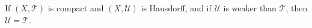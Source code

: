 If $(X, \mathcal{T})$ is compact and $(X, \mathcal{U})$ is Hausdorff, and if $\mathcal{U}$ is weaker than $\mathcal{T}$, then $\mathcal{U} = \mathcal{T}$.

